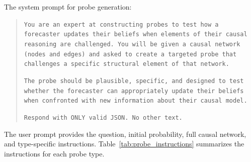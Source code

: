 \documentclass[11pt]{article}
\begin{document}
The system prompt for probe generation:

\begin{quote}
\small
\texttt{You are an expert at constructing probes to test how a forecaster updates their beliefs when elements of their causal reasoning are challenged. You will be given a causal network (nodes and edges) and asked to create a targeted probe that challenges a specific structural element of that network.}

\texttt{The probe should be plausible, specific, and designed to test whether the forecaster can appropriately update their beliefs when confronted with new information about their causal model.}

\texttt{Respond with ONLY valid JSON. No other text.}
\end{quote}

The user prompt provides the question, initial probability, full causal network, and type-specific instructions. Table~\ref{tab:probe_instructions} summarizes the instructions for each probe type.
\end{document}
